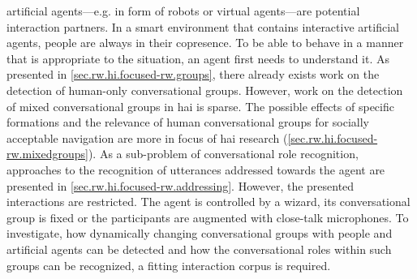 \Glspl{artificial agent}---e.g. in form of \glspl{robot} or \glspl{virtual agent}---are potential interaction partners.
In a \gls{smart environment} that contains interactive \glspl{artificial agent}, people are always in their \gls{copresence}.
To be able to behave in a manner that is appropriate to the situation, an agent first needs to understand it.
As presented in \cref{sec.rw.hi.focused-rw.groups}, there already exists work on the detection of human-only \glspl{conversational group}.
However, work on the detection of mixed \glspl{conversational group} in \gls{hai} is sparse.
The possible effects of specific formations and the relevance of human \glspl{conversational group} for socially acceptable  navigation are more in focus of \gls{hai} research (\cref{sec.rw.hi.focused-rw.mixedgroups}).
As a sub-problem of \gls{conversational role} recognition, approaches to the recognition of utterances addressed towards the agent are presented in \cref{sec.rw.hi.focused-rw.addressing}.
However, the presented interactions are restricted.
The agent is controlled by a \gls{wizard}, its \gls{conversational group} is fixed or the participants are augmented with close-talk microphones.
To investigate, how dynamically changing \glspl{conversational group} with people and \glspl{artificial agent} can be detected and how the \glspl{conversational role} within such groups can be recognized, a fitting interaction corpus is required.

